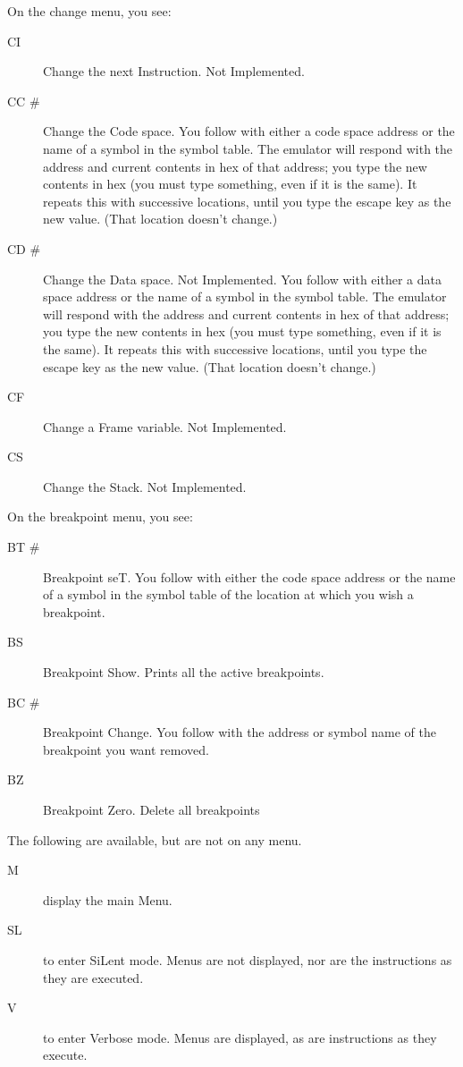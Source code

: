 \documentclass {report}
\begin{document}
On the change menu, you see:\begin {description}
\item[CI] Change the next Instruction. Not Implemented.
\item[CC \#] Change the Code space. 
You follow with either a code space
address or the name of a symbol in the symbol table.  The emulator will 
respond with the address and current contents in hex of that address; 
you type the new contents in hex (you must type something, 
even if it is the same).
It repeats this with successive locations, until you type the escape 
key as the new value.  (That location doesn't change.)
\item[CD \#] Change the Data space. Not Implemented.
You follow with either a data space
address or the name of a symbol in the symbol table.  The emulator will 
respond with the address and current contents in hex of that address; 
you type the new contents in hex (you must type something, 
even if it is the same).
It repeats this with successive locations, until you type the escape 
key as the new value.  (That location doesn't change.)
\item[CF] Change a Frame variable. Not Implemented.
\item[CS] Change the Stack.  Not Implemented.
\end {description}

On the breakpoint menu, you see:\begin {description}
\item[BT \#] Breakpoint seT.  You follow with either the code space 
address or the name of a symbol in the symbol table of the location 
at which you wish a breakpoint.
\item[BS] Breakpoint Show.  Prints all the active breakpoints.
\item[BC \#] Breakpoint Change.  You follow with the address or symbol
name of the breakpoint you want removed.
\item[BZ] Breakpoint Zero.  Delete all breakpoints
\end {description}

The following are available, but are not on any menu.\begin {description}
\item[M] display the main Menu.
\item[SL] to enter SiLent mode. Menus are not displayed, nor are the
instructions as they are executed.
\item[V] to enter Verbose mode.  Menus are displayed, as are instructions 
as they execute.
\end {description}
\end{document}
